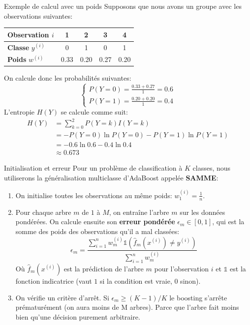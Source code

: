\begin{frame}{Exemple de calcul avec un poids}
	Supposons que nous avons un groupe avec les observations suivantes:
	\begin{table}
		\centering
		\begin{tabular}{|l|c|c|c|c|}
			\hline
			\textbf{Observation} $i$ & 1 & 2 & 3 & 4 \\
			\hline
			\textbf{Classe} $y^{(i)}$ & 0 & 1 & 0 & 1 \\
			\hline
			\textbf{Poids} $w^{(i)}$ & 0.33 & 0.20 & 0.27 & 0.20 \\
			\hline
		\end{tabular}
	\end{table}
	On calcule donc les probabilités suivantes:
	\begin{equation*}
		\begin{cases}
			P(Y = 0) = \frac{0.33 + 0.27}{1} = 0.6 \\
			P(Y = 1) = \frac{0.20 + 0.20}{1} = 0.4
		\end{cases}
	\end{equation*}
	L'entropie $H(Y)$ se calcule comme suit:
	\begin{equation*}
		\begin{aligned}
			H(Y) 
			&= \sum_{k=0}^2 P(Y = k) I(Y = k) \\
			&= - P(Y = 0) \ln P(Y = 0) - P(Y = 1) \ln P(Y = 1) \\
			&= - 0.6 \ln 0.6 - 0.4 \ln 0.4 \\
			&\approx 0.673
		\end{aligned}
	\end{equation*}
\end{frame}

\begin{frame}{Initialisation et erreur}
	Pour un problème de classification à $K$ classes, nous utiliserons la généralisation multiclasse d'AdaBoost appelée \textbf{SAMME}:
	\begin{enumerate}
		\item On initialise toutes les observations au même poids: $w_1^{(i)} = \frac{1}{n}$.
		\pause
		\item Pour chaque arbre $m$ de $1$ à $M$, on entraîne l'arbre $m$ sur les données pondérées. On calcule ensuite son \textbf{erreur pondérée} $\epsilon_m \in [0, 1]$, qui est la somme des poids des observations qu'il a mal classées:
		\begin{equation*}
			\epsilon_m = \frac{\sum_{i=1}^n w_m^{(i)} \mathds{1}(\hat{f}_m(x^{(i)}) \neq y^{(i)})}{\sum_{i=1}^n w_m^{(i)}}
		\end{equation*}
		Où $\hat{f}_m(x^{(i)})$ est la prédiction de l'arbre $m$ pour l'observation $i$ et $\mathds{1}$ est la fonction indicatrice (vaut $1$ si la condition est vraie, $0$ sinon).
		\pause
		\item On vérifie un critère d'arrêt. Si $\epsilon_m \ge (K - 1)/ K$ le boosting s'arrête prématurément (on aura moins de M arbres). Parce que l'arbre fait moins bien qu'une décision purement arbitraire.
	\end{enumerate}
\end{frame}

